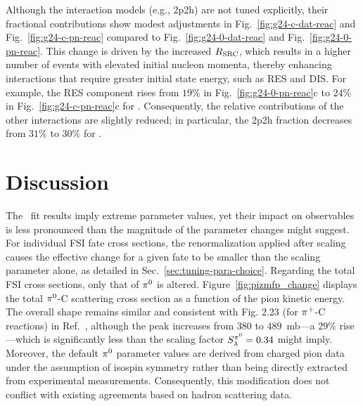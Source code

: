     Although the interaction models (e.g., 2p2h) are not tuned explicitly, their fractional contributions show modest adjustments in Fig.~\ref{fig:g24-c-dat-reac} and Fig.~\ref{fig:g24-c-pn-reac} compared to Fig.~\ref{fig:g24-0-dat-reac} and Fig.~\ref{fig:g24-0-pn-reac}. 
    This change is driven by the increased $R_\textrm{SRC}$, which results in a higher number of events with elevated initial nucleon momenta, thereby enhancing interactions that require greater initial state energy, such as RES and DIS. 
    For example, the RES component rises from $19\%$ in Fig.~\ref{fig:g24-0-pn-reac}c to $24\%$ in Fig.~\ref{fig:g24-c-pn-reac}c for \minzpi. 
    Consequently, the relative contributions of the other interactions are slightly reduced; in particular, the 2p2h fraction decreases from $31\%$ to $30\%$ for \minzpi.

\section{Discussion}
The \gC\ fit results imply extreme parameter values, yet their impact on observables is less pronounced than the magnitude of the parameter changes might suggest. 
For individual FSI fate cross sections, the renormalization applied after scaling causes the effective change for a given fate to be smaller than the scaling parameter alone, as detailed in Sec.~\ref{sec:tuning-para-choice}.
Regarding the total FSI cross sections, only that of $\pi^0$ is altered.
Figure~\ref{fig:pizmfp_change} displays the total $\pi^0$-C scattering cross section as a function of the pion kinetic energy. 
The overall shape remains similar and consistent with Fig. 2.23 (for $\pi^+$-C reactions) in Ref.~\cite{Andreopoulos:2015wxa}, although the peak increases from $380$ to $489$~mb---a $29\%$ rise---which is significantly less than the scaling factor $S_\lambda^{\pi^{0}}=0.34$ might imply. 
Moreover, the default $\pi^0$ parameter values are derived from charged pion data under the assumption of isospin symmetry rather than being directly extracted from experimental measurements. 
Consequently, this modification does not conflict with existing agreements based on hadron scattering data.
